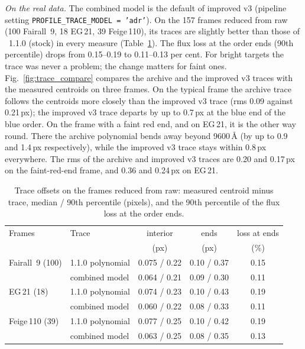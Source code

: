 \textit{On the real data.} The combined model is the default of improved v3 (pipeline setting
\texttt{PROFILE\_TRACE\_MODEL = 'adr'}). On the 157 frames reduced from raw (100 Fairall~9, 18 EG\,21, 39 Feige\,110),
its traces are slightly better than those of \banzai{}~1.1.0 (stock) in every measure (Table~\ref{tab:tracereal}).
The flux loss at the order ends (90th percentile) drops from 0.15--0.19 to 0.11--0.13 per cent. For bright targets
the trace was never a problem; the change matters for faint ones.
Fig.~\ref{fig:trace_compare} compares the archive and the improved v3 traces with the measured centroids on three
frames. On the typical frame the archive trace follows the centroids more closely than the improved v3 trace (rms 0.09
against 0.21\,px); the improved v3 trace departs by up to 0.7\,px at the blue end of the blue order. On the frame with a
faint red end, and on EG\,21, it is the other way round. There the archive polynomial bends away beyond 9600\,\AA{}
(by up to 0.9 and 1.4\,px respectively), while the improved v3 trace stays within 0.8\,px everywhere. The rms of the
archive and improved v3 traces are 0.20 and 0.17\,px on the faint-red-end frame, and 0.36 and 0.24\,px on EG\,21.

\begin{table}[!htbp]
\centering
\caption{Trace offsets on the frames reduced from raw: measured centroid minus trace, median / 90th percentile
(pixels), and the 90th percentile of the flux loss at the order ends.}
\label{tab:tracereal}
\begin{tabular}{llccc}
\toprule
Frames & Trace & interior & ends & loss at ends \\
 & & (px) & (px) & (\%) \\
\midrule
Fairall~9 (100) & 1.1.0 polynomial & 0.075 / 0.22 & 0.10 / 0.37 & 0.15 \\
 & combined model & 0.064 / 0.21 & 0.09 / 0.30 & 0.11 \\
EG\,21 (18) & 1.1.0 polynomial & 0.074 / 0.23 & 0.10 / 0.43 & 0.19 \\
 & combined model & 0.060 / 0.22 & 0.08 / 0.33 & 0.11 \\
Feige\,110 (39) & 1.1.0 polynomial & 0.077 / 0.25 & 0.10 / 0.42 & 0.19 \\
 & combined model & 0.063 / 0.25 & 0.08 / 0.35 & 0.13 \\
\bottomrule
\end{tabular}
\end{table}

